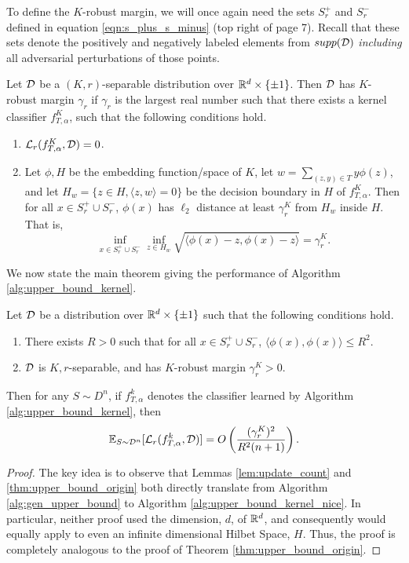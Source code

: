 To define the $K$-robust margin, we will once again need the sets $S_r^+$ and $S_r^-$ defined in equation \ref{eqn:s_plus_s_minus} (top right of page 7). Recall that these sets denote the positively and negatively labeled elements from $supp({\mathcal D})$ \textit{including} all adversarial perturbations of those points. 

\begin{defn}\label{defn:k_rob_margin}
Let ${\mathcal D}$ be a $(K, r)$-separable distribution over $\mathbb R^d \times \{ \pm 1\}$. Then ${\mathcal D}$ has $K$-robust margin $\gamma_r$ if $\gamma_r$ is the largest real number such that there exists a kernel classifier $f_{T, \alpha}^K$, such that the following conditions hold.

\begin{enumerate}
	\item $\mathcal L_r(f_{T, \alpha}^K, {\mathcal D}) = 0$. 
	\item Let $\phi, H$ be the embedding function/space of $K$, let $w = \sum_{(z, y) \in T} y\phi(z)$, and let $H_w = \{z \in H, \langle z, w \rangle = 0\}$ be the decision boundary in $H$ of $f_{T, \alpha}^K$. Then for all $x \in S_r^+ \cup S_r^-$, $\phi(x)$ has $\ell_2$ distance at least $\gamma_r^K$ from $H_w$ inside $H$. That is, $$\inf_{x \in S_r^+ \cup S_r^-} \inf_{z \in H_w} \sqrt{\langle \phi(x) - z, \phi(x) - z \rangle} = \gamma_r^K.$$ 
\end{enumerate}
\end{defn}

We now state the main theorem giving the performance of Algorithm \ref{alg:upper_bound_kernel}. 

\begin{thm}
Let ${\mathcal D}$ be a distribution over $\mathbb R^d \times \{\pm 1\}$ such that the following conditions hold. 
\begin{enumerate}
	\item There exists $R > 0$ such that for all $x \in S_r^+ \cup S_r^-$, $\langle \phi(x), \phi(x) \rangle \leq R^2$.
	\item ${\mathcal D}$ is $K, r$-separable, and has $K$-robust margin $\gamma_r^K > 0$.
\end{enumerate}
Then for any $S \sim D^n$, if $f_{T, \alpha}^k$ denotes the classifier learned by Algorithm \ref{alg:upper_bound_kernel}, then $${\mathbb E}_{S \sim {\mathcal D}^n}[\mathcal L_r(f_{T, \alpha}^k, {\mathcal D})] = O\left(\frac{(\gamma_r^K)^2}{R^2(n+1)} \right).$$
\end{thm}

\begin{proof}
The key idea is to observe that Lemmas \ref{lem:update_count} and \ref{thm:upper_bound_origin} both directly translate from Algorithm \ref{alg:gen_upper_bound} to Algorithm \ref{alg:upper_bound_kernel_nice}. In particular, neither proof used the dimension, $d$, of $\mathbb R^d$, and consequently would equally apply to even an infinite dimensional Hilbet Space, $H$. Thus, the proof is completely analogous to the proof of Theorem \ref{thm:upper_bound_origin}.
\end{proof}







 